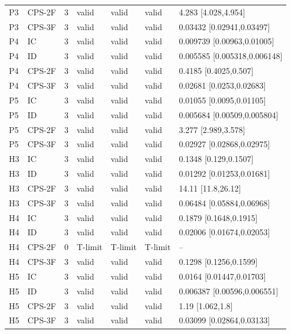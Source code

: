 \begin{longtable}{lllllll}
P3 & CPS-2F & 3 & valid & valid & valid & 4.283 [4.028,4.954] \\
P3 & CPS-3F & 3 & valid & valid & valid & 0.03432 [0.02941,0.03497] \\
P4 & IC & 3 & valid & valid & valid & 0.009739 [0.00963,0.01005] \\
P4 & ID & 3 & valid & valid & valid & 0.005585 [0.005318,0.006148] \\
P4 & CPS-2F & 3 & valid & valid & valid & 0.4185 [0.4025,0.507] \\
P4 & CPS-3F & 3 & valid & valid & valid & 0.02681 [0.0253,0.02683] \\
P5 & IC & 3 & valid & valid & valid & 0.01055 [0.0095,0.01105] \\
P5 & ID & 3 & valid & valid & valid & 0.005684 [0.00509,0.005804] \\
P5 & CPS-2F & 3 & valid & valid & valid & 3.277 [2.989,3.578] \\
P5 & CPS-3F & 3 & valid & valid & valid & 0.02927 [0.02868,0.02975] \\
H3 & IC & 3 & valid & valid & valid & 0.1348 [0.129,0.1507] \\
H3 & ID & 3 & valid & valid & valid & 0.01292 [0.01253,0.01681] \\
H3 & CPS-2F & 3 & valid & valid & valid & 14.11 [11.8,26.12] \\
H3 & CPS-3F & 3 & valid & valid & valid & 0.06484 [0.05884,0.06968] \\
H4 & IC & 3 & valid & valid & valid & 0.1879 [0.1648,0.1915] \\
H4 & ID & 3 & valid & valid & valid & 0.02006 [0.01674,0.02053] \\
H4 & CPS-2F & 0 & T-limit & T-limit & T-limit & -- \\
H4 & CPS-3F & 3 & valid & valid & valid & 0.1298 [0.1256,0.1599] \\
H5 & IC & 3 & valid & valid & valid & 0.0164 [0.01447,0.01703] \\
H5 & ID & 3 & valid & valid & valid & 0.006387 [0.00596,0.006551] \\
H5 & CPS-2F & 3 & valid & valid & valid & 1.19 [1.062,1.8] \\
H5 & CPS-3F & 3 & valid & valid & valid & 0.03099 [0.02864,0.03133] \\
\bottomrule
\end{longtable}
\endgroup
